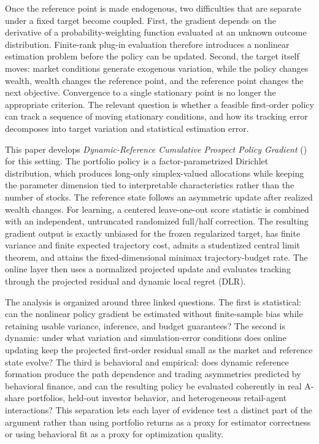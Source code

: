 Once the reference point is made endogenous, two difficulties that are separate under a fixed target become coupled.  First, the \CPT gradient depends on the derivative of a probability-weighting function evaluated at an unknown outcome distribution.  Finite-rank plug-in evaluation therefore introduces a nonlinear estimation problem before the policy can be updated.  Second, the target itself moves: market conditions generate exogenous variation, while the policy changes wealth, wealth changes the reference point, and the reference point changes the next \CPT objective.  Convergence to a single stationary point is no longer the appropriate criterion.  The relevant question is whether a feasible first-order policy can track a sequence of moving stationary conditions, and how its tracking error decomposes into target variation and statistical estimation error.

This paper develops \emph{Dynamic-Reference Cumulative Prospect Policy Gradient} (\DRCPTPG) for this setting.  The portfolio policy is a factor-parametrized Dirichlet distribution, which produces long-only simplex-valued allocations while keeping the parameter dimension tied to interpretable characteristics rather than the number of stocks.  The reference state follows an asymmetric update after realized wealth changes.  For learning, a centered leave-one-out score statistic is combined with an independent, untruncated randomized full/half correction.  The resulting gradient output is exactly unbiased for the frozen regularized \CPT target, has finite variance and finite expected trajectory cost, admits a studentized central limit theorem, and attains the fixed-dimensional minimax trajectory-budget rate.  The online layer then uses a normalized projected update and evaluates tracking through the projected residual and dynamic local regret (DLR).

The analysis is organized around three linked questions.  The first is statistical: can the nonlinear \CPT policy gradient be estimated without finite-sample bias while retaining usable variance, inference, and budget guarantees?  The second is dynamic: under what variation and simulation-error conditions does online updating keep the projected first-order residual small as the market and reference state evolve?  The third is behavioral and empirical: does dynamic reference formation produce the path dependence and trading asymmetries predicted by behavioral finance, and can the resulting policy be evaluated coherently in real A-share portfolios, held-out investor behavior, and heterogeneous retail-agent interactions?  This separation lets each layer of evidence test a distinct part of the argument rather than using portfolio returns as a proxy for estimator correctness or using behavioral fit as a proxy for optimization quality.

